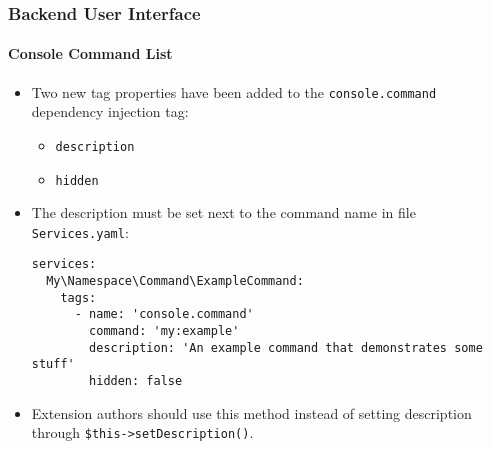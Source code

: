 %

\begin{frame}[fragile]
	\frametitle{Backend User Interface}
	\framesubtitle{Console Command List}


	\begin{itemize}
		\item Two new tag properties have been added to the \texttt{console.command}
			dependency injection tag:

			\begin{itemize}
				\item \texttt{description}
				\item \texttt{hidden}
			\end{itemize}

		\item The description must be set next to the command name in file
			\texttt{Services.yaml}:
\begin{lstlisting}
services:
  My\Namespace\Command\ExampleCommand:
    tags:
      - name: 'console.command'
        command: 'my:example'
        description: 'An example command that demonstrates some stuff'
        hidden: false
\end{lstlisting}

		\item Extension authors should use this method instead of setting
			description through \texttt{\$this->setDescription()}.

	\end{itemize}

\end{frame}

